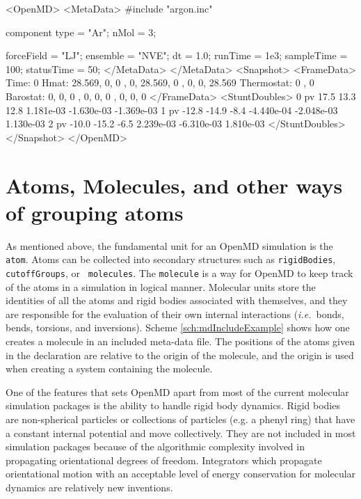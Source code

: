 \documentclass[]{book}
\begin{document}
\begin{code}[caption={Revised OpenMD input file
example.},label={sch:mdExPrime}]
<OpenMD>
  <MetaData>
#include "argon.inc"

component{
  type = "Ar";
  nMol = 3;
}

forceField = "LJ";
ensemble = "NVE";
dt = 1.0;
runTime = 1e3;
sampleTime = 100;
statusTime = 50; 
  </MetaData>
  </MetaData>
  <Snapshot>
    <FrameData>
        Time: 0
        Hmat: {{ 28.569, 0, 0 }, { 0, 28.569, 0 }, { 0, 0, 28.569 }}
  Thermostat: 0 , 0
    Barostat: {{ 0, 0, 0 }, { 0, 0, 0 }, { 0, 0, 0 }}
    </FrameData>
    <StuntDoubles>
         0      pv   17.5  13.3 12.8  1.181e-03 -1.630e-03 -1.369e-03
         1      pv  -12.8 -14.9 -8.4 -4.440e-04 -2.048e-03  1.130e-03
         2      pv  -10.0 -15.2 -6.5  2.239e-03 -6.310e-03  1.810e-03
    </StuntDoubles>
  </Snapshot>
</OpenMD>
\end{code}

\section{\label{section:atomsMolecules}Atoms, Molecules, and other
ways of grouping atoms}

As mentioned above, the fundamental unit for an {\sc OpenMD}
simulation is the {\tt atom}.  Atoms can be collected into secondary
structures such as {\tt rigidBodies}, {\tt cutoffGroups}, or {\tt
  molecules}. The {\tt molecule} is a way for {\sc OpenMD} to keep
track of the atoms in a simulation in logical manner. Molecular units
store the identities of all the atoms and rigid bodies associated with
themselves, and they are responsible for the evaluation of their own
internal interactions (\emph{i.e.}~bonds, bends, torsions, and
inversions). Scheme \ref{sch:mdIncludeExample} shows how one creates a
molecule in an included meta-data file. The positions of the atoms
given in the declaration are relative to the origin of the molecule,
and the origin is used when creating a system containing the molecule.

One of the features that sets {\sc OpenMD} apart from most of the
current molecular simulation packages is the ability to handle rigid
body dynamics. Rigid bodies are non-spherical particles or collections
of particles (e.g. a phenyl ring) that have a constant internal
potential and move collectively.\cite{Goldstein01} They are not
included in most simulation packages because of the algorithmic
complexity involved in propagating orientational degrees of freedom.
Integrators which propagate orientational motion with an acceptable
level of energy conservation for molecular dynamics are relatively new
inventions.
\end{document}
